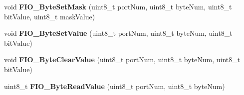 \begin{DoxyCompactItemize}
\item 
\hypertarget{group___g_p_i_o___public___functions_ga7d462b16053264f9a85f9f036dc8de77}{void {\bfseries \-F\-I\-O\-\_\-\-Byte\-Set\-Mask} (uint8\-\_\-t port\-Num, uint8\-\_\-t byte\-Num, uint8\-\_\-t bit\-Value, uint8\-\_\-t mask\-Value)}\label{group___g_p_i_o___public___functions_ga7d462b16053264f9a85f9f036dc8de77}

\item 
\hypertarget{group___g_p_i_o___public___functions_ga4dbb71990764ae3709f8db3a3baba220}{void {\bfseries \-F\-I\-O\-\_\-\-Byte\-Set\-Value} (uint8\-\_\-t port\-Num, uint8\-\_\-t byte\-Num, uint8\-\_\-t bit\-Value)}\label{group___g_p_i_o___public___functions_ga4dbb71990764ae3709f8db3a3baba220}

\item 
\hypertarget{group___g_p_i_o___public___functions_gaa1a9c3d36155d91bf6d9b87aa8248273}{void {\bfseries \-F\-I\-O\-\_\-\-Byte\-Clear\-Value} (uint8\-\_\-t port\-Num, uint8\-\_\-t byte\-Num, uint8\-\_\-t bit\-Value)}\label{group___g_p_i_o___public___functions_gaa1a9c3d36155d91bf6d9b87aa8248273}

\item 
\hypertarget{group___g_p_i_o___public___functions_ga76ef00d302b3639ae779a8dc6f4501b9}{uint8\-\_\-t {\bfseries \-F\-I\-O\-\_\-\-Byte\-Read\-Value} (uint8\-\_\-t port\-Num, uint8\-\_\-t byte\-Num)}\label{group___g_p_i_o___public___functions_ga76ef00d302b3639ae779a8dc6f4501b9}

\end{DoxyCompactItemize}
